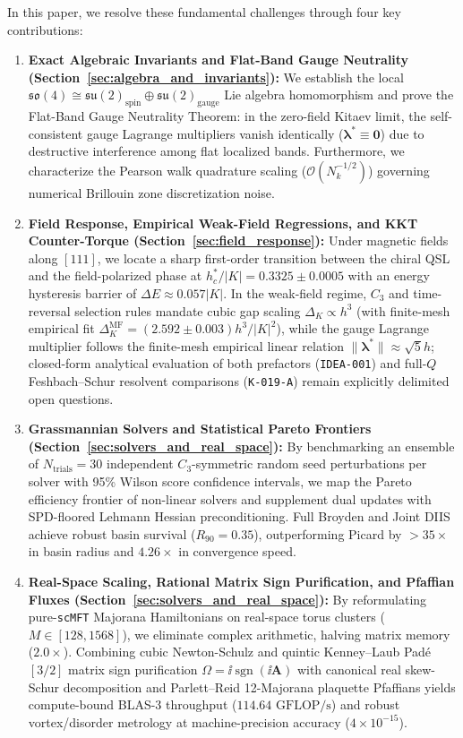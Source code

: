 In this paper, we resolve these fundamental challenges through four key contributions:
\begin{enumerate}
\item \textbf{Exact Algebraic Invariants and Flat-Band Gauge Neutrality (Section~\ref{sec:algebra_and_invariants}):} We establish the local $\mathfrak{so}(4) \cong \mathfrak{su}(2)_{\mathrm{spin}} \oplus \mathfrak{su}(2)_{\mathrm{gauge}}$ Lie algebra homomorphism and prove the Flat-Band Gauge Neutrality Theorem: in the zero-field Kitaev limit, the self-consistent gauge Lagrange multipliers vanish identically ($\boldsymbol{\lambda}^* \equiv \mathbf{0}$) due to destructive interference among flat localized bands. Furthermore, we characterize the Pearson walk quadrature scaling ($\mathcal{O}(N_k^{-1/2})$) governing numerical Brillouin zone discretization noise.
\item \textbf{Field Response, Empirical Weak-Field Regressions, and KKT Counter-Torque (Section~\ref{sec:field_response}):} Under magnetic fields along $[111]$, we locate a sharp first-order transition between the chiral QSL and the field-polarized phase at $h_c^* / |K| = 0.3325 \pm 0.0005$ with an energy hysteresis barrier of $\Delta E \approx 0.057 |K|$. In the weak-field regime, $C_3$ and time-reversal selection rules mandate cubic gap scaling $\Delta_K \propto h^3$ (with finite-mesh empirical fit $\Delta_K^{\mathrm{MF}} = (2.592 \pm 0.003) h^3/|K|^2$), while the gauge Lagrange multiplier follows the finite-mesh empirical linear relation $\|\boldsymbol{\lambda}^*\| \approx \sqrt{5} h$; closed-form analytical evaluation of both prefactors (\texttt{IDEA-001}) and full-$Q$ Feshbach--Schur resolvent comparisons (\texttt{K-019-A}) remain explicitly delimited open questions.
\item \textbf{Grassmannian Solvers and Statistical Pareto Frontiers (Section~\ref{sec:solvers_and_real_space}):} By benchmarking an ensemble of $N_{\mathrm{trials}} = 30$ independent $C_3$-symmetric random seed perturbations per solver with 95\% Wilson score confidence intervals, we map the Pareto efficiency frontier of non-linear solvers and supplement dual updates with SPD-floored Lehmann Hessian preconditioning. Full Broyden and Joint DIIS achieve robust basin survival ($R_{90} = 0.35$), outperforming Picard by $>35\times$ in basin radius and $4.26\times$ in convergence speed.
\item \textbf{Real-Space Scaling, Rational Matrix Sign Purification, and Pfaffian Fluxes (Section~\ref{sec:solvers_and_real_space}):} By reformulating pure-\texttt{scMFT} Majorana Hamiltonians on real-space torus clusters ($M \in [128, 1568]$), we eliminate complex arithmetic, halving matrix memory ($2.0\times$). Combining cubic Newton-Schulz and quintic Kenney--Laub Pad\'e $[3/2]$ matrix sign purification $\Omega = \ii \operatorname{sgn}(\ii \mathbf{A})$ with canonical real skew-Schur decomposition and Parlett--Reid 12-Majorana plaquette Pfaffians yields compute-bound BLAS-3 throughput ($114.64\text{ GFLOP/s}$) and robust vortex/disorder metrology at machine-precision accuracy ($4 \times 10^{-15}$).
\end{enumerate}
